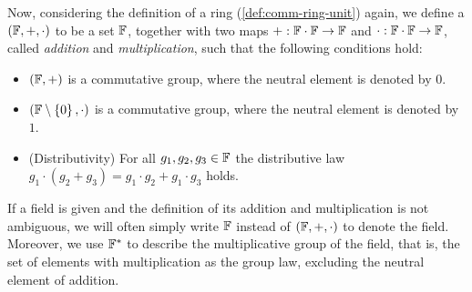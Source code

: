 Now, considering the definition of a ring (\ref{def:comm-ring-unit}) again, we define a  $ (\mathbb{F}, +, \cdot) $ to be a set $ \mathbb{F}$, together with two maps $ +: \mathbb{F} \cdot \mathbb{F} \to \mathbb{F} $ and $ \cdot: \mathbb{F} \cdot \mathbb{F} \to \mathbb{F} $, called \textit{addition} and \textit{multiplication}, such that the following conditions hold:

\begin{definition}{}\label{def:field}
\begin{itemize}
\item $ \left (\mathbb{F}, + \right) $ is a commutative group, where the neutral element is denoted by $ 0 $.
\item $ \left (\mathbb{F} \setminus \left \{0 \right \}, \cdot \right) $ is a commutative group, where the neutral element is denoted by $ 1 $.
\item (Distributivity) For all $ g_1, g_2, g_3 \in \mathbb{F} $ the distributive law
$g_1 \cdot \left (g_2 + g_3 \right) = g_1 \cdot g_2 + g_1 \cdot g_3$ holds.
\end{itemize}
\end{definition}
If a field is given and the definition of its addition and multiplication is not ambiguous, we will often simply write $\mathbb{F}$ instead of $(\mathbb{F},+,\cdot)$ to denote the field. Moreover, we use $\mathbb{F}^*$ to describe the multiplicative group of the field, that is, the set of elements with multiplication as the group law, excluding the neutral element of addition.


